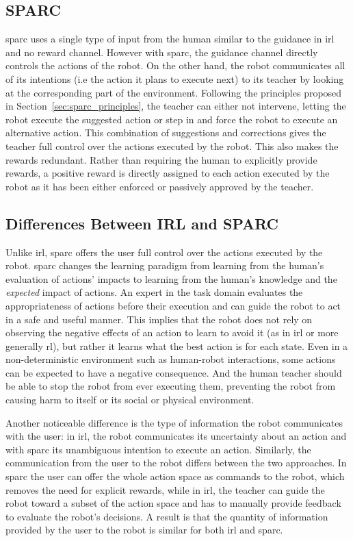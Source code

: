 \subsection{SPARC}

\gls{sparc} uses a single type of input from the human similar to the guidance in \gls{irl} and no reward channel. However with \gls{sparc}, the guidance channel directly controls the actions of the robot. On the other hand, the robot communicates all of its intentions (i.e the action it plans to execute next) to its teacher by looking at the corresponding part of the environment. Following the principles proposed in Section~\ref{sec:sparc_principles}, the teacher can either not intervene, letting the robot execute the suggested action or step in and force the robot to execute an alternative action. This combination of suggestions and corrections gives the teacher full control over the actions executed by the robot. This also makes the rewards redundant. Rather than requiring the human to explicitly provide rewards, a positive reward is directly assigned to each action executed by the robot as it has been either enforced or passively approved by the teacher.

\subsection{Differences Between IRL and SPARC}

Unlike \gls{irl}, \gls{sparc} offers the user full control over the actions executed by the robot. \gls{sparc} changes the learning paradigm from learning from the human's evaluation of actions' impacts to learning from the human's knowledge and the \emph{expected} impact of actions. An expert in the task domain evaluates the appropriateness of actions before their execution and can guide the robot to act in a safe and useful manner. This implies that the robot does not rely on observing the negative effects of an action to learn to avoid it (as in \gls{irl} or more generally \gls{rl}), but rather it learns what the best action is for each state. Even in a non-deterministic environment such as human-robot interactions, some actions can be expected to have a negative consequence. And the human teacher should be able to stop the robot from ever executing them, preventing the robot from causing harm to itself or its social or physical environment. 

Another noticeable difference is the type of information the robot communicates with the user: in \gls{irl}, the robot communicates its uncertainty about an action and with \gls{sparc} its unambiguous intention to execute an action. Similarly, the communication from the user to the  robot differs between the two approaches. In \gls{sparc} the user can offer the whole action space as commands to the robot, which removes the need for explicit rewards, while in \gls{irl}, the teacher can guide the robot toward a subset of the action space and has to manually provide feedback to evaluate the robot's decisions. A result is that the quantity of information provided by the user to the robot is similar for both \gls{irl} and \gls{sparc}. 

